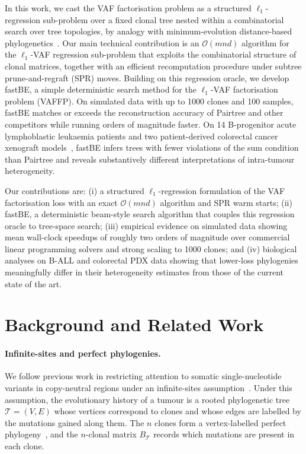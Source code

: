 In this work, we cast the VAF factorisation problem as a structured $\ell_1$-regression sub-problem over a fixed clonal tree nested within a combinatorial search over tree topologies, by analogy with minimum-evolution distance-based phylogenetics~\cite{desper2002fastme,lefort2015fastme,price2010fasttree}. Our main technical contribution is an $\mathcal{O}(mnd)$ algorithm for the $\ell_1$-VAF regression sub-problem that exploits the combinatorial structure of clonal matrices, together with an efficient recomputation procedure under subtree prune-and-regraft (SPR) moves. Building on this regression oracle, we develop fastBE, a simple deterministic search method for the $\ell_1$-VAF factorisation problem (VAFFP). On simulated data with up to 1000 clones and 100 samples, fastBE matches or exceeds the reconstruction accuracy of Pairtree and other competitors while running orders of magnitude faster. On 14 B-progenitor acute lymphoblastic leukaemia patients and two patient-derived colorectal cancer xenograft models~\cite{rehman2021diapause,ulintz2018polyclonal}, fastBE infers trees with fewer violations of the sum condition than Pairtree and reveals substantively different interpretations of intra-tumour heterogeneity.

Our contributions are: (i) a structured $\ell_1$-regression formulation of the VAF factorisation loss with an exact $\mathcal{O}(mnd)$ algorithm and SPR warm starts; (ii) fastBE, a deterministic beam-style search algorithm that couples this regression oracle to tree-space search; (iii) empirical evidence on simulated data showing mean wall-clock speedups of roughly two orders of magnitude over commercial linear programming solvers and strong scaling to 1000 clones; and (iv) biological analyses on B-ALL and colorectal PDX data showing that lower-loss phylogenies meaningfully differ in their heterogeneity estimates from those of the current state of the art.

\section{Background and Related Work}

\paragraph{Infinite-sites and perfect phylogenies.}
We follow previous work in restricting attention to somatic single-nucleotide variants in copy-neutral regions under an infinite-sites assumption~\cite{elkebir2015reconstruction,deshwar2015phylowgs,popic2015lichee,malikic2015citup,roth2014pyclone,satas2017pastri,myers2019calder,wintersinger2022pairtree}. Under this assumption, the evolutionary history of a tumour is a rooted phylogenetic tree $\mathcal{T}=(V,E)$ whose vertices correspond to clones and whose edges are labelled by the mutations gained along them. The $n$ clones form a vertex-labelled perfect phylogeny~\cite{elkebir2015reconstruction}, and the $n$-clonal matrix $B_{\mathcal{T}}$ records which mutations are present in each clone.

